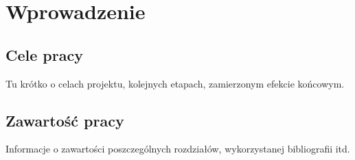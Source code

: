 \chapter{Wprowadzenie}
\label{cha:wprowadzenie}


\section{Cele pracy}
\label{sec:celePracy}


Tu krótko o celach projektu, kolejnych etapach, zamierzonym efekcie końcowym.



\section{Zawartość pracy}

Informacje o zawartości poszczególnych rozdziałów, wykorzystanej bibliografii itd.
\label{sec:zawartoscPracy}
